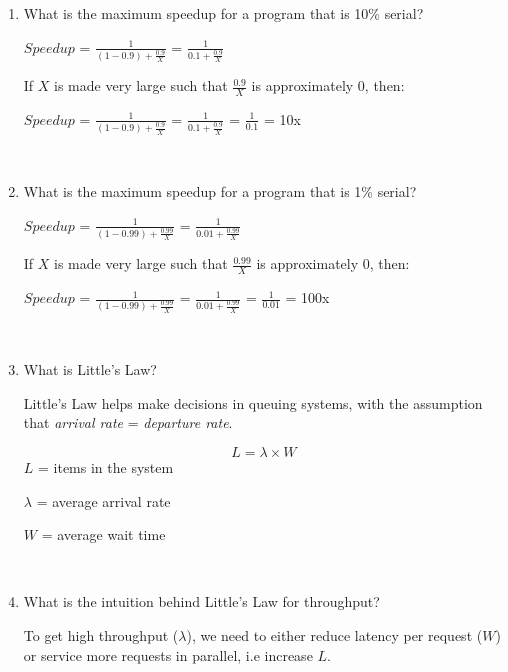 \documentclass[12pt]{article}
\newenvironment{QandA}{\begin{enumerate}[label=\bfseries\arabic*.]\bfseries}
                      {\end{enumerate}}
\newenvironment{answered}{\par\quad\normalfont}{}
\begin{document}
\begin{QandA}
\begin{answered}
        $S$ = number of threads
        \end{answered}
        
        \
    
    \item What is the maximum speedup for a program that is 10\% serial?
        \begin{answered}
        $Speedup$ = $\frac{1}{(1-0.9) + \frac{0.9}{X}}$ = $\frac{1}{0.1 + \frac{0.9}{X}}$
        
        If $X$ is made very large such that $\frac{0.9}{X}$ is approximately $0$, then:
        
        $Speedup$ = $\frac{1}{(1-0.9) + \frac{0.9}{X}}$ = $\frac{1}{0.1 + \frac{0.9}{X}}$ = $\frac{1}{0.1}$ = 10x
        \end{answered}
        
        \

    \item What is the maximum speedup for a program that is 1\% serial?
        \begin{answered}
        $Speedup$ = $\frac{1}{(1-0.99) + \frac{0.99}{X}}$ = $\frac{1}{0.01 + \frac{0.99}{X}}$
        
        If $X$ is made very large such that $\frac{0.99}{X}$ is approximately $0$, then:
        
        $Speedup$ = $\frac{1}{(1-0.99) + \frac{0.99}{X}}$ = $\frac{1}{0.01 + \frac{0.99}{X}}$ = $\frac{1}{0.01}$ = 100x
        \end{answered}
        
        \
        
    \item What is Little's Law?
        \begin{answered}
        Little's Law helps make decisions in queuing systems, with the assumption that \textit{arrival rate} = \textit{departure rate}.
        
        \begin{equation}
            L = \lambda \times W
        \end{equation}
        $L$ = items in the system
        
        $\lambda$ = average arrival rate
        
        $W$ = average wait time 
        \end{answered}
        
        \
    
    \item What is the intuition behind Little's Law for throughput?
        \begin{answered}
        To get high throughput ($\lambda$), we need to either reduce latency per request ($W$) or service more requests in parallel, i.e increase $L$.
        \end{answered}
\end{QandA}
\end{document}
